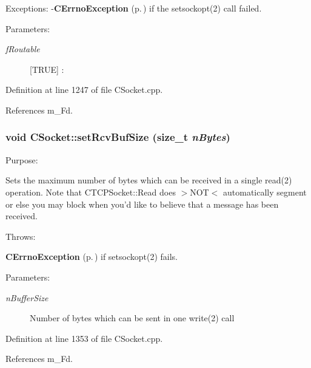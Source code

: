 Exceptions: -{\bf CErrno\-Exception} {\rm (p.\,\pageref{classCErrnoException})} if the setsockopt(2) call failed.\begin{Desc}
\item[Parameters: ]\par
\begin{description}
\item[{\em 
f\-Routable}][TRUE] :
\end{description}
\end{Desc}


Definition at line 1247 of file CSocket.cpp.

References m\_\-Fd.
\subsubsection{\setlength{\rightskip}{0pt plus 5cm}void CSocket::set\-Rcv\-Buf\-Size (size\_\-t {\em n\-Bytes})}\label{classCSocket_a30}


Purpose:

Sets the maximum number of bytes which can be received in a single read(2) operation. Note that CTCPSocket::Read does $>$NOT$<$  automatically segment or else you may block when you'd like to believe that a message has been received.

Throws:\begin{CompactItemize}
\item 
{\bf CErrno\-Exception} {\rm (p.\,\pageref{classCErrnoException})} if setsockopt(2) fails.\end{CompactItemize}
\begin{Desc}
\item[Parameters: ]\par
\begin{description}
\item[{\em 
n\-Buffer\-Size}]Number of bytes which can be sent in one write(2) call \end{description}
\end{Desc}


Definition at line 1353 of file CSocket.cpp.

References m\_\-Fd.
